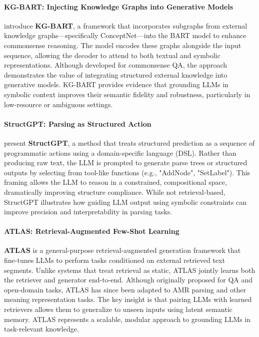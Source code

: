 \paragraph{KG-BART: Injecting Knowledge Graphs into Generative Models}

\citet{liu2021kgbart} introduce \textbf{KG-BART}, a framework that incorporates subgraphs from external knowledge graphs—specifically ConceptNet—into the BART model to enhance commonsense reasoning. The model encodes these graphs alongside the input sequence, allowing the decoder to attend to both textual and symbolic representations. Although developed for commonsense QA, the approach demonstrates the value of integrating structured external knowledge into generative models. KG-BART provides evidence that grounding LLMs in symbolic context improves their semantic fidelity and robustness, particularly in low-resource or ambiguous settings.

\paragraph{StructGPT: Parsing as Structured Action}

\citet{lu2023structgpt} present \textbf{StructGPT}, a method that treats structured prediction as a sequence of programmatic actions using a domain-specific language (DSL). Rather than producing raw text, the LLM is prompted to generate parse trees or structured outputs by selecting from tool-like functions (e.g., "AddNode", "SetLabel"). This framing allows the LLM to reason in a constrained, compositional space, dramatically improving structure compliance. While not retrieval-based, StructGPT illustrates how guiding LLM output using symbolic constraints can improve precision and interpretability in parsing tasks.

\paragraph{ATLAS: Retrieval-Augmented Few-Shot Learning}

\textbf{ATLAS} \citep{izacard2024atlas} is a general-purpose retrieval-augmented generation framework that fine-tunes LLMs to perform tasks conditioned on external retrieved text segments. Unlike systems that treat retrieval as static, ATLAS jointly learns both the retriever and generator end-to-end. Although originally proposed for QA and open-domain tasks, ATLAS has since been adapted to AMR parsing and other meaning representation tasks. The key insight is that pairing LLMs with learned retrievers allows them to generalize to unseen inputs using latent semantic memory. ATLAS represents a scalable, modular approach to grounding LLMs in task-relevant knowledge.

